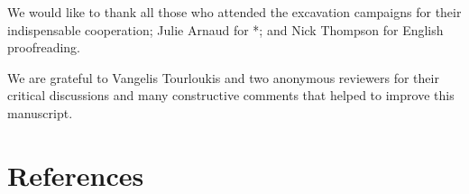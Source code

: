 \documentclass[5p,authoryear]{elsarticle} %
\begin{document}
We would like to thank all those who attended the excavation campaigns for their indispensable cooperation; Julie Arnaud for *; and Nick Thompson for English proofreading.

We are grateful to Vangelis Tourloukis and two anonymous reviewers for their critical discussions and many constructive comments that helped to improve this manuscript.

\section*{References}



\end{document}
